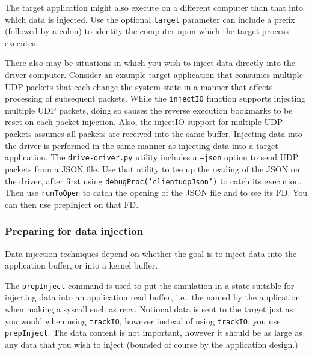 \documentclass[titlepage]{article}
\begin{document}
The target application might also execute on a different computer than that into which data is injected.  Use the optional {\tt target} parameter
can include a prefix (followed by a colon) to identify the computer upon which the target process executes.

There also may be situations in which you wish to inject data directly into the driver computer.  Consider an example target application that consumes
multiple UDP packets that each change the system state in a manner that affects processing of subsequent packets.  While the {\tt injectIO} function
supports injecting multiple UDP packets, doing so causes the reverse execution bookmarks to be reset on each packet injection.  Also, the injectIO
support for multiple UDP packets assumes all packets are received into the same buffer.  Injecting data into the driver is performed in the same
manner as injecting data into a target application.  The {\tt drive-driver.py} utility includes a {\tt --json} option to send UDP packets from a
JSON file.  Use that utility to tee up the reading of the JSON on the driver, after first using {\tt debugProc('clientudpJson')} to catch its execution.
Then use {\tt runToOpen} to catch the opening of the JSON file and to see its FD.  You can then use prepInject on that FD.

\subsubsection{Preparing for data injection}
\label{prepInject}
Data injection techniques depend on whether the goal is to inject data into the application buffer, or into a kernel buffer.

The {\tt prepInject} command is used to put the simulation in a state suitable for injecting data into an application
read buffer, i.e., the named by the application when making a syscall such as recv.  Notional data is sent to the target just as you would when using
{\tt trackIO}, however instead of using {\tt trackIO}, you use {\tt prepInject}.  The data content is not important, however it should be as large as
any data that you wish to inject (bounded of course by the application design.)
\end{document}
